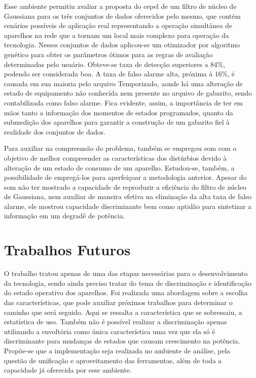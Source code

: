 Esse ambiente permitiu avaliar a proposta do \acs{cepel} de um filtro
de núcleo de Gaussiana para os três conjuntos de dados oferecidos pelo
mesmo, que contém cenários possíveis de aplicação real representando a
operação simultânea de aparelhos na rede que a tornam um local mais
complexo para operação da tecnologia. Nesses conjuntos de dados
aplicou-se um otimizador por algoritmo genético para obter os
parâmetros ótimos para as regras de avaliação determinadas pelo
usuário. Obteve-se taxa de detecção superiores a 84\%, podendo ser
considerada boa. A taxa de falso alarme alta, próxima à 16\%, é
causada em sua maioria pelo arquivo Temporizado, aonde há uma
alteração de estado de equipamento não conhecida nem presente no
arquivo de gabarito, sendo contabilizada como falso alarme. Fica
evidente, assim, a importância de ter em mãos tanto a informação dos
momentos de estados programados, quanto da submedição dos aparelhos
para garantir a construção de um gabarito fiel à realidade dos
conjuntos de dados. 


Para auxiliar na compreensão do problema, também se empregou \acs{som}
com o objetivo de melhor compreender as características dos distúrbios
devido à alteração de um estado de consumo de um aparelho. Estudou-se,
também, a possibilidade de empregá-los para aperfeiçoar a metodologia
anterior. Apesar do \acs{som} não ter mostrado a capacidade de
reproduzir a eficiência do filtro de núcleo de Gaussiana, nem auxiliar
de maneira efetiva na eliminação da alta taxa de falso alarme, ele
mostrou capacidade discriminante bem como aptidão para sintetizar a
informação em um degradê de potência.

\section{Trabalhos Futuros}
\label{sec:trabfut}

O trabalho tratou apenas de uma das etapas necessárias para o
desenvolvimento da tecnologia, sendo ainda preciso tratar do tema de
discriminação e identificação do estado operativo dos aparelhos.
Foi realizada uma abordagem sobre a escolha das características, que
pode auxiliar próximos trabalhos para determinar o caminho que será
seguido. Aqui se ressalta a característica que se sobressaiu, a
estatística de uso. Também não é possível realizar a discriminação
apenas utilizando a envoltória como única característica uma vez que
ela só é discriminante para mudanças de estados que causam crescimento
na potência. Propõe-se que a implementação seja realizada no ambiente
de análise, pela questão de unificação e aproveitamento das
ferramentas, além de toda a capacidade já oferecida por esse ambiente.


